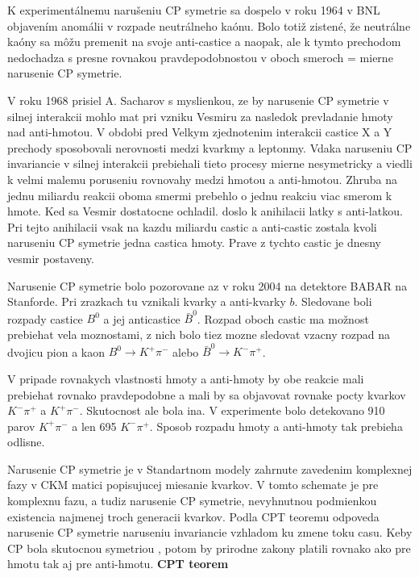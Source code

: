\documentclass[../../main.tex]{subfiles}
\begin{document}
K experimentálnemu narušeniu CP symetrie sa dospelo v roku 1964 v BNL objavením anomálii v rozpade neutrálneho kaónu. Bolo totiž zistené, že neutrálne kaóny sa môžu premenit na svoje anti-castice a naopak, ale k tymto prechodom nedochadza s presne rovnakou pravdepodobnostou v oboch smeroch = mierne narusenie CP symetrie.\par
V roku 1968 prisiel A. Sacharov s myslienkou, ze by narusenie CP symetrie v silnej interakcii mohlo mat pri vzniku Vesmiru za nasledok prevladanie hmoty nad anti-hmotou. V obdobi pred Velkym zjednotenim interakcii castice X a Y prechody sposobovali nerovnosti medzi kvarkmy a leptonmy. Vdaka naruseniu CP invariancie v silnej interakcii prebiehali tieto procesy mierne nesymetricky a viedli  k velmi malemu poruseniu rovnovahy medzi hmotou a anti-hmotou. Zhruba na jednu miliardu reakcii oboma smermi prebehlo o jednu reakciu viac smerom k hmote. Ked sa Vesmir dostatocne ochladil. doslo k anihilacii latky s anti-latkou. Pri tejto anihilacii vsak na kazdu miliardu castic a anti-castic zostala kvoli naruseniu CP symetrie jedna castica hmoty. Prave z tychto castic je dnesny vesmir postaveny.\par
Narusenie CP symetrie bolo pozorovane az v roku 2004 na detektore BABAR na Stanforde. Pri zrazkach tu vznikali kvarky a anti-kvarky $b$. Sledovane boli rozpady castice $B^0$ a jej anticastice $\bar{B}^0$. Rozpad oboch castic ma možnost prebiehat vela moznostami, z nich bolo tiez mozne sledovat vzacny rozpad na dvojicu pion a kaon $B^0 \rightarrow K^+ \pi^-$ alebo $\bar{B}^0 \rightarrow K^- \pi^+$.\par
V pripade rovnakych vlastnosti hmoty a anti-hmoty by obe reakcie mali prebiehat rovnako pravdepodobne a mali by sa objavovat rovnake pocty kvarkov $K^- \pi^+$ a $K^+ \pi^-$. Skutocnost ale bola ina. V experimente bolo detekovano 910 parov $K^+ \pi^-$ a len  695 $K^- \pi^+$. Sposob rozpadu hmoty a anti-hmoty tak prebieha odlisne.\par
Narusenie CP symetrie je v Standartnom modely zahrnute zavedenim komplexnej fazy v CKM matici popisujucej miesanie kvarkov. V tomto schemate je pre komplexnu fazu, a tudiz narusenie CP symetrie, nevyhnutnou podmienkou existencia najmenej troch generacii kvarkov. Podla CPT teoremu odpoveda narusenie CP symetrie naruseniu invariancie vzhladom ku zmene toku casu. Keby CP bola skutocnou symetriou , potom by prirodne zakony platili rovnako ako pre hmotu tak aj pre anti-hmotu.
\newline 
\textbf{CPT teorem}\par
\end{document}
